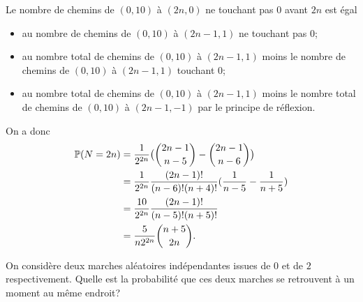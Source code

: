 \documentclass[11pt]{td_um}
\begin{document}
\begin{exo}{}
\begin{enumerate}
{             Le nombre de chemins de $(0,10)$ à $(2n,0)$ ne touchant pas $0$ avant $2n$ est égal
             \begin{itemize}
                 \item au nombre de chemins de $(0,10)$ à $(2n-1,1)$ ne touchant pas $0$;
                 \item au nombre total de chemins de $(0,10)$ à $(2n-1,1)$ moins le nombre de chemins de $(0,10)$ à $(2n-1,1)$ touchant $0$;
                 \item au nombre total de chemins de $(0,10)$ à $(2n-1,1)$ moins le nombre total de chemins de $(0,10)$ à $(2n-1,-1)$ par le principe de réflexion.
             \end{itemize}
             On a donc
             \begin{align*}
                 \mathbb{P}(N=2n)
                 &=\frac{1}{2^{2n}}\big(\binom{2n-1}{n-5}-\binom{2n-1}{n-6}\big)\\
                 &=\frac{1}{2^{2n}}\frac{(2n-1)!}{(n-6)!(n+4)!}(\frac{1}{n-5}-\frac{1}{n+5})\\
                 &=\frac{10}{2^{2n}}\frac{(2n-1)!}{(n-5)!(n+5)!}\\
                 &=\frac{5}{n2^{2n}}\binom{n+5}{2n}.
             \end{align*}
         }
 \end{enumerate}
\end{exo}


\begin{exo}{} %
On considère deux marches aléatoires indépendantes issues de $0$ et de $2$ respectivement. Quelle est la probabilité que ces deux marches se retrouvent à un moment au même endroit?
\end{exo}
\end{document}
